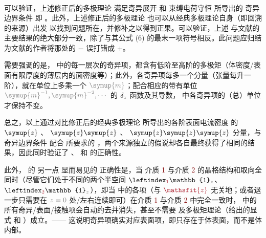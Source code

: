 \begin{subequations}
\begin{align}
\end{align}
\end{subequations}
可以验证，上述修正后的多极理论  满足奇异展开  和 束缚电荷守恒  所导出的 奇异边界条件  即 。此外，上述修正后的多极理论  也可以从经典多极理论自身（即回溯  的来源）出发\cite{raabMultipoleTheoryElectromagnetism2004,delangeElectromagneticBoundaryConditions2013} 以找到问题所在，并修补之以得到正果。可以验证，上述  与文献\cite{delangeElectromagneticBoundaryConditions2013}的主要结果的绝大部分一致，除了与其公式 (6) 的最末一项符号相反。此问题应归结为文献\cite{delangeElectromagneticBoundaryConditions2013}的作者将那处的 $-$ 误打错成 $+$。

需要强调的是， 中的每一层次的奇异项，都含有低阶至高阶的多极矩（体密度/表面有限厚度的薄层内的面密度等）；此外，各奇异项每多一个分量（张量每升一阶），就在单位上多乘一个 $\mathcolor{gray}{\symup{m}}$；配合相应的带有单位 $\mathcolor{gray}{\symup{m}^{-1}},\mathcolor{gray}{\symup{m}^{-2}},\cdots$ 的 $\delta_{\mathcolor{gray}{z}}$ 函数及其导数， 中各奇异项的（总）单位才保持不变。

总之，以上通过对比修正后的经典多极理论  所导出的各阶表面电流密度  的 $\symup{z}$ 、 $\symup{z} \symup{z}$ 、 $\symup{z} \symup{z} \symup{z}$ 分量，与奇异边界条件  配合  所要求的 ，两个来源独立的假说却各自最终获得了相同的结果，因此同时验证了  、  和  的正确性。

此外， 的 另一点 显而易见的 正确性是，当 介质 \textcolor{Maroon}{1} 与介质 \textcolor{Maroon}{2} 的晶格结构和取向全同时（尽管它们处于不同的两个半空间 $\leftindex_{\textcolor{Maroon}{1}} {\mathbb{1}}_{\mathcolor{gray}{z}}$、$\leftindex_{\textcolor{Maroon}{2}} {\mathbb{1}}_{\mathcolor{gray}{z}}$），即当  中的各项（与 $\textcolor{Maroon}{\mathsfit{z}}$ 无关地；或者退一步只需要在 $\mathcolor{gray}{z \mathcolor{black}{=} 0}$ 处/左右连续即可）在介质 \textcolor{Maroon}{1} 与介质 \textcolor{Maroon}{2} 中完全一致时， 中的所有奇异/表面/接触项会自动约去并消失，甚至不需要  及多极矩理论（给出的显式  和 ）成立。—— 这说明奇异项确实对应表面项，即只存在于体表面，而不是体内部。

